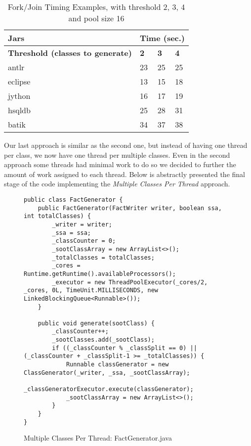 \documentclass{dithesis}
\begin{document}
		\begin{table}[H]
			\centering
            \begin{tabular}{@{}l|lll@{}}
            \toprule
            \textbf{Jars}    	& \multicolumn{3}{l}{\textbf{Time (sec.)}}  \\ \midrule
            \textbf{Threshold (classes to generate)} 	& \textbf{2}  & \textbf{3}  & \textbf{4}  \\ \midrule
            antlr            	& 23          & 25           & 25           \\
            eclipse          	& 13          & 15           & 18           \\
            jython           	& 16          & 17           & 19           \\
            hsqldb           	& 25          & 28           & 31           \\
            batik            	& 34          & 37           & 38           \\ \bottomrule
            \end{tabular}
            \newline
			\caption[Fork/Join Timing Examples]{Fork/Join Timing Examples, with threshold 2, 3, 4 and pool size 16}
		\end{table}


        Our last approach is similar as the second one, but instead of having one thread per class, we now have one thread per multiple classes. Even in the second approach some threads had minimal work to do so we decided to further the amount of work assigned to each thread. Below is abstractly presented the final stage of the code implementing the \textit{Multiple Classes Per Thread} approach.

        \begin{figure}[H]
\begin{lstlisting}
public class FactGenerator {
    public FactGenerator(FactWriter writer, boolean ssa, int totalClasses) {
        _writer = writer;
        _ssa = ssa;
        _classCounter = 0;
        _sootClassArray = new ArrayList<>();
        _totalClasses = totalClasses;
        _cores = Runtime.getRuntime().availableProcessors();
        _executor = new ThreadPoolExecutor(_cores/2, _cores, 0L, TimeUnit.MILLISECONDS, new LinkedBlockingQueue<Runnable>());
    }

    public void generate(sootClass) {
        _classCounter++;
        _sootClasses.add(_sootClass);
        if ((_classCounter % _classSplit == 0) || (_classCounter + _classSplit-1 >= _totalClasses)) {
            Runnable classGenerator = new ClassGenerator(_writer, _ssa, _sootClassArray);
            _classGeneratorExecutor.execute(classGenerator);
            _sootClassArray = new ArrayList<>();
        }
    }
}
\end{lstlisting}
        \caption{Multiple Classes Per Thread: FactGenerator.java}
        \end{figure}
\end{document}
